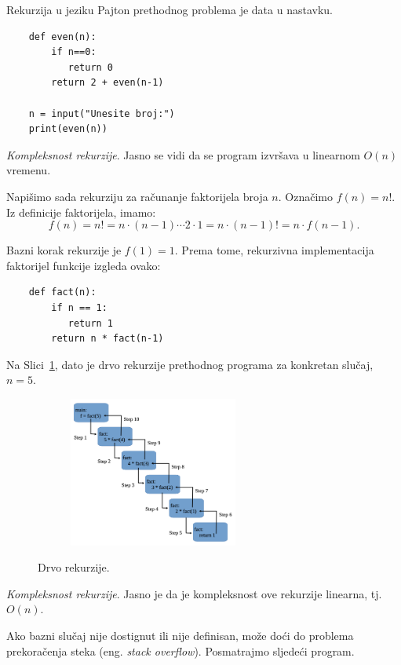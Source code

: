 Rekurzija u jeziku Pajton  prethodnog    problema je data u nastavku.

\begin{verbatim}
	def even(n):
		if n==0:
		   return 0
		return 2 + even(n-1) 
		
	n = input("Unesite broj:")
	print(even(n)) 

\end{verbatim}

\textit{Kompleksnost rekurzije}. Jasno se vidi da se program izvršava u linearnom $O(n)$ vremenu. \\ \vspace{0.2cm}

Napišimo sada rekurziju za računanje faktorijela broja $n$. Označimo $f(n) = n!$. Iz definicije faktorijela, imamo: 
$$f(n) = n! = n \cdot (n-1) \cdots 2 \cdot 1  = n \cdot (n-1)! = n \cdot f(n-1).$$

Bazni korak rekurzije je $f(1)= 1$. Prema tome, rekurzivna implementacija faktorijel funkcije izgleda ovako:
\begin{verbatim}
	def fact(n):
		if n == 1:
		   return 1
		return n * fact(n-1)
\end{verbatim}

Na Slici~\ref{fig:rec_tree}, dato je drvo rekurzije prethodnog programa za konkretan slučaj, $n=5$.

\begin{figure}[H]
	\centering
	\includegraphics[width=220pt,height=140pt]{slike/factorial_recursion_tree.png} 
	\label{fig:rec_tree}
	\caption{Drvo rekurzije.}
\end{figure}

 


\textit{Kompleksnost rekurzije}. Jasno je da je kompleksnost ove rekurzije linearna, tj. $O(n)$. \\ \vspace{0.2cm}


Ako bazni slučaj nije dostignut ili nije definisan, može doći do problema  prekoračenja steka (eng. \textit{stack overflow}). Posmatrajmo sljedeći program.


